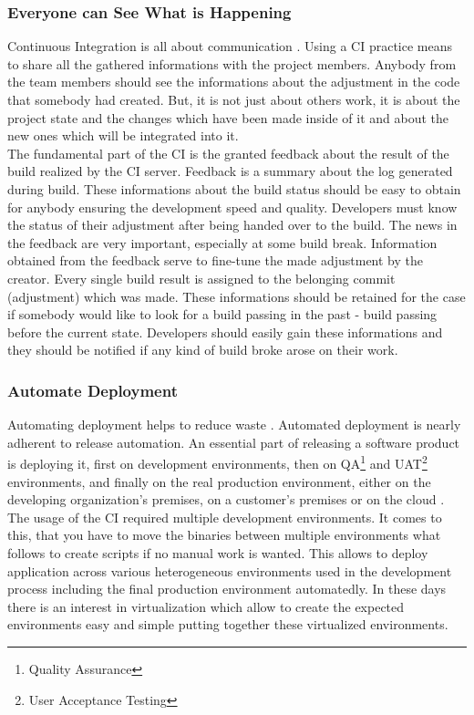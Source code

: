 \subsubsection{Everyone can See What is Happening}

Continuous Integration is all about communication \cite{MartinFowler}. Using a CI practice means to share all the gathered informations with the project members. Anybody from the team members should see the informations about the adjustment in the code that somebody had created. But, it is not just about others work, it is about the project state and the changes which have been made inside of it and about the new ones which will be integrated into it.\\

The fundamental part of the CI is the granted feedback about the result of the build realized by the CI server. Feedback is a summary about the log generated 
during build. These informations about the build status should be easy to obtain for anybody ensuring the development speed and quality. Developers must know the status of their adjustment after being handed over to the build. The news in the feedback are very important, especially at some build break. Information obtained from the feedback serve to fine-tune the made adjustment by the creator. Every single build result is assigned to the belonging commit (adjustment) which was made. These informations should be retained for the case if somebody would like to look for a build passing in the past - build passing before the current state. Developers should easily gain these informations and they should be notified if any kind of build broke arose on their work.

\subsubsection{Automate Deployment}

Automating deployment helps to reduce waste \cite{CollabNet}. Automated deployment is nearly adherent to release automation. An essential part of releasing a software product is deploying it, first on development environments, then on QA\footnote{Quality Assurance} and UAT\footnote{User Acceptance Testing} environments, and finally on the real production environment, either on the developing organization's premises, on a customer's premises or on the cloud \cite{deployment_automation}. The usage of the CI required multiple development environments. It comes to this, that you have to move the binaries between multiple environments what follows to create scripts if no manual work is wanted. This allows to deploy application across various heterogeneous environments used in the development process including the final production environment automatedly. In these days there is an interest in virtualization which allow to create the expected environments easy and simple putting together these virtualized environments.\\

